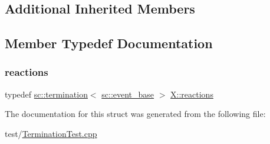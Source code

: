 \subsection*{Additional Inherited Members}


\subsection{Member Typedef Documentation}
\mbox{\label{struct_x_a09a50a25894eeeafb9f2d6ef00334902}} 
\subsubsection{\texorpdfstring{reactions}{reactions}}
{\footnotesize\ttfamily typedef \mbox{\hyperlink{classboost_1_1statechart_1_1termination}{sc\+::termination}}$<$ \mbox{\hyperlink{classboost_1_1statechart_1_1event__base}{sc\+::event\+\_\+base}} $>$ \mbox{\hyperlink{struct_x_a09a50a25894eeeafb9f2d6ef00334902}{X\+::reactions}}}



The documentation for this struct was generated from the following file\+:\begin{DoxyCompactItemize}
\item 
test/\mbox{\hyperlink{_termination_test_8cpp}{Termination\+Test.\+cpp}}\end{DoxyCompactItemize}
